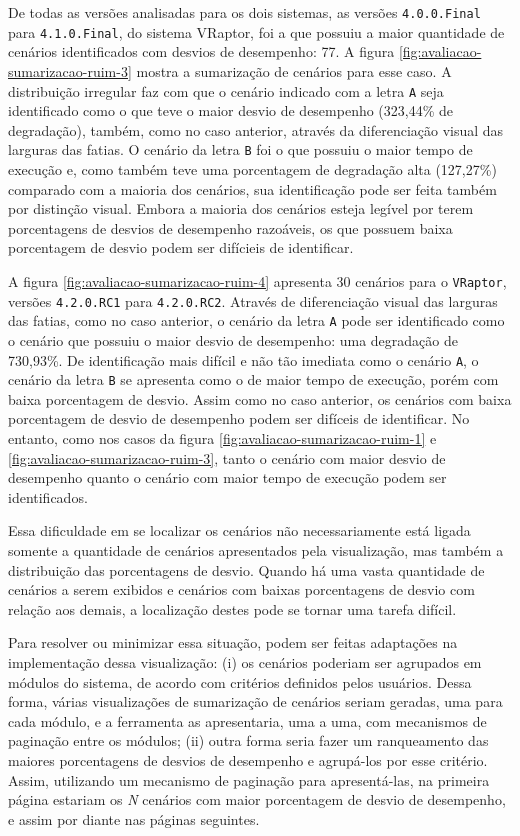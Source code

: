 De todas as versões analisadas para os dois sistemas, as versões \texttt{4.0.0.Final} para \texttt{4.1.0.Final}, do sistema VRaptor, foi a que possuiu a maior quantidade de cenários identificados com desvios de desempenho: 77. A figura \ref{fig:avaliacao-sumarizacao-ruim-3} mostra a sumarização de cenários para esse caso. A distribuição irregular faz com que o cenário indicado com a letra \texttt{A} seja identificado como o que teve o maior desvio de desempenho (323,44\% de degradação), também, como no caso anterior, através da diferenciação visual das larguras das fatias. O cenário da letra \texttt{B} foi o que possuiu o maior tempo de execução e, como também teve uma porcentagem de degradação alta (127,27\%) comparado com a maioria dos cenários, sua identificação pode ser feita também por distinção visual. Embora a maioria dos cenários esteja legível por terem porcentagens de desvios de desempenho razoáveis, os que possuem baixa porcentagem de desvio podem ser difícieis de identificar.

A figura \ref{fig:avaliacao-sumarizacao-ruim-4} apresenta 30 cenários para o \texttt{VRaptor}, versões \texttt{4.2.0.RC1} para \texttt{4.2.0.RC2}. Através de diferenciação visual das larguras das fatias, como no caso anterior, o cenário da letra \texttt{A} pode ser identificado como o cenário que possuiu o maior desvio de desempenho: uma degradação de 730,93\%. De identificação mais difícil e não tão imediata como o cenário \texttt{A}, o cenário da letra \texttt{B} se apresenta como o de maior tempo de execução, porém com baixa porcentagem de desvio. Assim como no caso anterior, os cenários com baixa porcentagem de desvio de desempenho podem ser difíceis de identificar. No entanto, como nos casos da figura \ref{fig:avaliacao-sumarizacao-ruim-1} e \ref{fig:avaliacao-sumarizacao-ruim-3}, tanto o cenário com maior desvio de desempenho quanto o cenário com maior tempo de execução podem ser identificados.

Essa dificuldade em se localizar os cenários não necessariamente está ligada somente a quantidade de cenários apresentados pela visualização, mas também a distribuição das porcentagens de desvio. Quando há uma vasta quantidade de cenários a serem exibidos e cenários com baixas porcentagens de desvio com relação aos demais, a localização destes pode se tornar uma tarefa difícil.

Para resolver ou minimizar essa situação, podem ser feitas adaptações na implementação dessa visualização: (i) os cenários poderiam ser agrupados em módulos do sistema, de acordo com critérios definidos pelos usuários. Dessa forma, várias visualizações de sumarização de cenários seriam geradas, uma para cada módulo, e a ferramenta as apresentaria, uma a uma, com mecanismos de paginação entre os módulos; (ii) outra forma seria fazer um ranqueamento das maiores porcentagens de desvios de desempenho e agrupá-los por esse critério. Assim, utilizando um mecanismo de paginação para apresentá-las, na primeira página estariam os \textit{N} cenários com maior porcentagem de desvio de desempenho, e assim por diante nas páginas seguintes.

